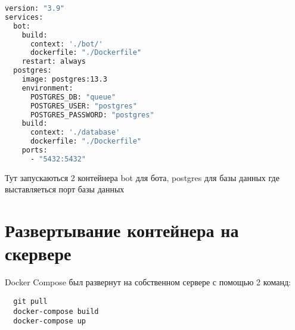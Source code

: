 \begin{lstlisting}[language=Dockerfile
, caption=\leftline{Dockerfile базы данных}
, label=lst:DС]
version: "3.9"
services:
  bot:
    build:
      context: './bot/'
      dockerfile: "./Dockerfile"
    restart: always
  postgres:
    image: postgres:13.3
    environment:
      POSTGRES_DB: "queue"
      POSTGRES_USER: "postgres"
      POSTGRES_PASSWORD: "postgres"
    build:
      context: './database'
      dockerfile: "./Dockerfile"
    ports:
      - "5432:5432"
\end{lstlisting}

Тут запускаються 2 контейнера bot для бота, postgres для базы данных где выставляеться порт базы данных \par

\section{Развертывание контейнера на скервере}
Docker Compose был развернут на собственном сервере с помощью 2 команд: \par
\begin{verbatim}
  git pull
  docker-compose build
  docker-compose up
\end{verbatim}
